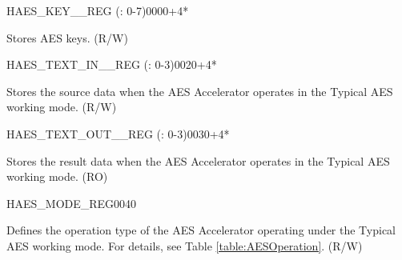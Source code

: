 \begin{register}{H}{AES\_KEY\_\_REG (: 0-7)}{\hexprefix{}0000+4*}\label{regdesc:AESKEYnREG}
%
\regnewline%
\begin{regdesc}\begin{reglist}
\item [AES\_KEY\_\regindex{n}\_REG (\regindex{n}: 0-7)] Stores AES keys. (R/W)
\end{reglist}\end{regdesc}
\end{register}


\begin{register}{H}{AES\_TEXT\_IN\_\_REG (: 0-3)}{\hexprefix{}0020+4*}\label{regdesc:AESTEXTINnREG}
%
\regnewline%
\begin{regdesc}\begin{reglist}
\item [AES\_TEXT\_IN\_\regindex{m}\_REG (\regindex{m}: 0-3)] Stores the source data when the AES Accelerator operates in the Typical AES working mode. (R/W)
\end{reglist}\end{regdesc}
\end{register}


\begin{register}{H}{AES\_TEXT\_OUT\_\_REG (: 0-3)}{\hexprefix{}0030+4*}\label{regdesc:AESTEXTOUTnREG}
%
\regnewline%
\begin{regdesc}\begin{reglist}
\item [AES\_TEXT\_OUT\_\regindex{m}\_REG (\regindex{m}: 0-3)] Stores the result data when the AES Accelerator operates in the Typical AES working mode. (RO)
\end{reglist}\end{regdesc}
\end{register}


\begin{register}{H}{AES\_MODE\_REG}{\hexprefix{}0040}\label{regdesc:AESMODEREG}
%
%
\regnewline%
\begin{regdesc}\begin{reglist}
\item [AES\_MODE] Defines the operation type of the AES Accelerator operating under the Typical AES working mode. For details, see Table \ref{table:AESOperation}. (R/W)
\end{reglist}\end{regdesc}
\end{register}



